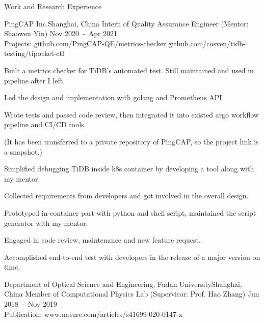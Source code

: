 \documentclass{resume} %
\begin{document}
\begin{rSection}{Work and Research Experience}
\begin{rSubsection}
\end{rSubsection}



\begin{rSubsection}
{PingCAP Inc.}{Shanghai, China}
{Intern of Quality Assurance Engineer (Mentor: Shaowen Yin)} {Nov 2020\ -\ Apr 2021
\\  Projects: github.com/PingCAP-QE/metrics-checker github.com/cosven/tidb-testing/tipocket-ctl
}

\item Built a metrics checker for TiDB's automated test. Still maintained and used in pipeline after I left.

\begin{mySecondItemize}
    \item Led the design and implementation with golang and Prometheus API.
    \item Wrote tests and passed code review, then integrated it into existed argo workflow pipeline and CI/CD tools.
    \item (It has been transferred to a private repository of PingCAP, so the project link is a snapshot.)
\end{mySecondItemize}

\item Simplified debugging TiDB inside k8s container by developing a tool along with my mentor.
\begin{mySecondItemize}
    \item Collected requirements from developers and got involved in the overall design.
    \item Prototyped in-container part with python and shell script, maintained the script generator with my mentor.
    \item Engaged in code review, maintenance and new feature request.
\end{mySecondItemize}
\item Accomplished end-to-end test with developers in the release of a major version on time.



\end{rSubsection}



\begin{rSubsection}
{Department of Optical Science and Engineering, Fudan University}{Shanghai, China}
{Member of Computational Physics Lab (Supervisor: Prof. Hao Zhang)}
{Jun 2018\ -\ Nov 2019
\\ Publication: www.nature.com/articles/s41699-020-0147-x }


\end{rSubsection}
\end{rSection}
\end{document}
